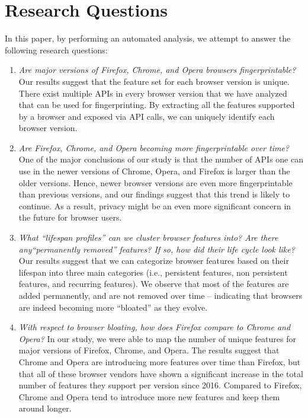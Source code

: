 \section{Research Questions}
\label{sec:research}

In this paper, by performing an automated analysis, we attempt to
answer the following research questions:

\begin{enumerate}
  
\item {\em Are major versions of Firefox, Chrome, and Opera browsers
  fingerprintable?} Our results suggest that the feature set for each
  browser version is unique. There exist multiple
  APIs in every browser version that we have analyzed that can be used
  for fingerprinting. By extracting all the features supported by a
  browser and exposed via API calls, we can uniquely identify each
  browser version.

\item {\em Are Firefox, Chrome, and Opera becoming more
  fingerprintable over time?} One of the major conclusions of our
  study is that the number of APIs one can use in the newer versions
  of Chrome, Opera, and Firefox is larger than the older versions. Hence, newer
  browser versions are even more fingerprintable than previous
  versions, and our findings suggest that this trend is likely to
  continue. As a result, privacy might be an even more significant
  concern in the future for browser users.
    
\item {\em What ``lifespan profiles'' can we cluster browser features
    into? Are there any``permanently removed'' features? If so, how
    did their life cycle look like?} Our results suggest that we can
  categorize browser features based on their lifespan into three main
  categories (i.e., persistent features, non persistent features, and
  recurring features). We observe that most of the features are added
  permanently, and are not removed over time -- indicating that
  browsers are indeed becoming more ``bloated'' as they evolve.

\item {\em With respect to browser bloating, how does Firefox compare
    to Chrome and Opera?} In our study, we were able to map the number of unique
  features for major versions of Firefox, Chrome, and Opera. The results
  suggest that Chrome and Opera are introducing more features over time than
  Firefox, but that all of these browser vendors have shown a significant
  increase in the total number of features they support per version
  since 2016. Compared to Firefox, Chrome and Opera tend to introduce more new
  features and keep them around longer.
 

\end{enumerate}
